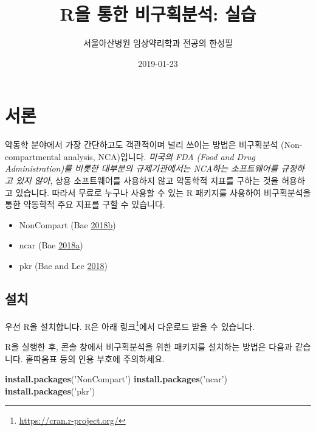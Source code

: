 \documentclass[9pt,]{krantz}
\title{R을 통한 비구획분석: 실습}
\author{서울아산병원 임상약리학과 전공의 한성필}
\date{2019-01-23}
\newenvironment{Shaded}{\begin{snugshade}}{\end{snugshade}}
\newcommand{\KeywordTok}[1]{\textcolor[rgb]{0.13,0.29,0.53}{\textbf{#1}}}
\newcommand{\NormalTok}[1]{#1}
\newcommand{\StringTok}[1]{\textcolor[rgb]{0.31,0.60,0.02}{#1}}
\providecommand{\tightlist}{%
  \setlength{\itemsep}{0pt}\setlength{\parskip}{0pt}}
\begin{document}
\maketitle

{
\hypersetup{linkcolor=}
\setcounter{tocdepth}{2}
\tableofcontents
}
\mainmatter

\hypertarget{intro}{%
\chapter{서론}\label{intro}}

약동학 분야에서 가장 간단하고도 객관적이며 널리 쓰이는 방법은 비구획분석 (Non-compartmental analysis, NCA)입니다.
\emph{미국의 FDA (Food and Drug Administration)를 비롯한 대부분의 규제기관에서는 NCA하는 소프트웨어를 규정하고 있지 않아}, 상용 소프트웨어를 사용하지 않고 약동학적 지표를 구하는 것을 허용하고 있습니다.
따라서 무료로 누구나 사용할 수 있는 R 패키지를 사용하여 비구획분석을 통한 약동학적 주요 지표를 구할 수 있습니다.

\begin{itemize}
\tightlist
\item
  NonCompart (Bae \protect\hyperlink{ref-R-NonCompart}{2018}\protect\hyperlink{ref-R-NonCompart}{b})
\item
  ncar (Bae \protect\hyperlink{ref-R-ncar}{2018}\protect\hyperlink{ref-R-ncar}{a})
\item
  pkr (Bae and Lee \protect\hyperlink{ref-R-pkr}{2018})
\end{itemize}

\hypertarget{section}{%
\section{설치}\label{section}}

우선 R을 설치합니다.
R은 아래 링크\footnote{\url{https://cran.r-project.org/}}에서 다운로드 받을 수 있습니다.

R을 실행한 후, 콘솔 창에서 비구획분석을 위한 패키지를 설치하는 방법은 다음과 같습니다.
홑따옴표 등의 인용 부호에 주의하세요.

\begin{Shaded}
\begin{Highlighting}[]
\KeywordTok{install.packages}\NormalTok{(}\StringTok{'NonCompart'}\NormalTok{)}
\KeywordTok{install.packages}\NormalTok{(}\StringTok{'ncar'}\NormalTok{)}
\KeywordTok{install.packages}\NormalTok{(}\StringTok{'pkr'}\NormalTok{)}
\end{Highlighting}
\end{Shaded}
\end{document}
